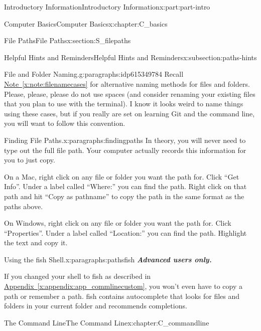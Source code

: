 \documentclass[oneside,10pt,]{book}
\newcommand{\xreffont}{\relax}
\newcommand{\alert}[1]{\textbf{\textit{#1}}}
\begin{document}
\begin{partptx}{Introductory Information}{}{Introductory Information}{}{}{x:part:part-intro}
\begin{chapterptx}{Computer Basics}{}{Computer Basics}{}{}{x:chapter:C_basics}
\begin{sectionptx}{File Paths}{}{File Paths}{}{}{x:section:S_filepaths}
\begin{subsectionptx}{Helpful Hints and Reminders}{}{Helpful Hints and Reminders}{}{}{x:subsection:paths-hints}
%
\begin{paragraphs}{File and Folder Naming.}{g:paragraphs:idp615349784}%
Recall \hyperref[x:note:filenamecases]{Note~{\xreffont\ref{x:note:filenamecases}}} for alternative naming methods for files and folders. Please, please, please do not use spaces (and consider renaming your existing files that you plan to use with the terminal). I know it looks weird to name things using these cases, but if you really are set on learning Git and the command line, you will want to follow this convention.%
\end{paragraphs}%
\begin{paragraphs}{Finding File Paths.}{x:paragraphs:findingpaths}%
%
In theory, you will never need to type out the full file path. Your computer actually records this information for you to just copy.%
\par
On a Mac, right click on any file or folder you want the path for. Click ``Get Info''. Under a label called ``Where:'' you can find the path. Right click on that path and hit ``Copy as pathname'' to copy the path in the same format as the paths above.%
\par
On Windows, right click on any file or folder you want the path for. Click ``Properties''. Under a label called ``Location:'' you can find the path. Highlight the text and copy it.%
\end{paragraphs}%
\begin{paragraphs}{Using the fish Shell.}{x:paragraphs:pathsfish}%
%
%
%
\alert{Advanced users only.}%
\par
If you changed your shell to fish as described in \hyperref[x:appendix:app_commlinecustom]{Appendix~{\xreffont\ref{x:appendix:app_commlinecustom}}}, you won't even have to copy a path or remember a path. fish contains autocomplete that looks for files and folders in your current folder and recommends completions.%
\end{paragraphs}%
\end{subsectionptx}
\end{sectionptx}
\end{chapterptx}
%
\typeout{************************************************}
\typeout{************************************************}
%
\begin{chapterptx}{The Command Line}{}{The Command Line}{}{}{x:chapter:C_commandline}
\begin{introduction}{}%

\end{introduction}
\end{chapterptx}
\end{partptx}
\end{document}
